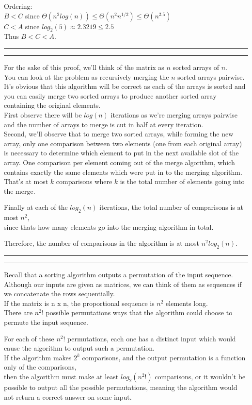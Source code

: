 \documentclass[11pt,letterpaper]{article}
\newcommand{\question}[1] {\vspace{.25in} \hrule\vspace{0.5em}
\noindent{\bf #1} \vspace{0.5em}
\hrule \vspace{.10in}}
\begin{document}
Ordering: \\
$B < C$ since $\Theta(n^{2} log(n)) \leq \Theta(n^{2} n^{1/2}) \leq \Theta(n^{2.5})$\\
$C < A$ since $log_2(5) \approx 2.3219 \leq 2.5$\\
Thus $B < C < A$.


\question{2a}
For the sake of this proof, we'll think of the matrix as $n$ sorted arrays of $n$. \\
You can look at the problem as recursively merging the $n$ sorted arrays pairwise.\\
It's obvious that this algorithm will be correct as each of the arrays is sorted and you can easily
merge two sorted arrays to produce another sorted array containing the original elements.\\
First observe there will be $log(n)$ iterations as we're merging arrays pairwise and the number of arrays to merge is cut in half at every iteration.\\

Second, we'll observe that to merge two sorted arrays, while forming the new array, only one comparison between two elements (one from each original array) is necessary to determine which element to put in the next available slot of the array.
One comparison per element coming out of the merge algorithm,
which contains exactly the same elements which were put in to the merging algorithm.
That's at most $k$ comparisons where $k$ is the total number of elements going into the merge.

Finally at each of the $log_2(n)$ iterations, the total number of comparisons is at most $n^2$,\\
since thats how many elements go into the merging algorithm in total.

Therefore, the number of comparisons in the algorithm is at most $n^2 log_2(n)$.

\question{2b}

Recall that a sorting algorithm outputs a permutation of the input sequence.\\
Although our inputs are given as matrices, we can think of them as sequences if we concatenate the rows sequentially.\\
If the matrix is n x n, the proportional sequence is $n^2$ elements long.\\
There are $n^2!$ possible permutations ways that the algorithm could choose to permute the input sequence.

For each of these $n^2!$ permutations, each one has a distinct input which would cause the algorithm to output such a permutation.\\
If the algorithm makes $2^k$ comparisons, and the output permutation is a function only of the comparisons,\\
then the algorithm must make at least $log_2(n^2!)$ comparisons, or it wouldn't be possible to output all the possible permutations, meaning the algorithm would not return a correct answer on some input.
\end{document}
